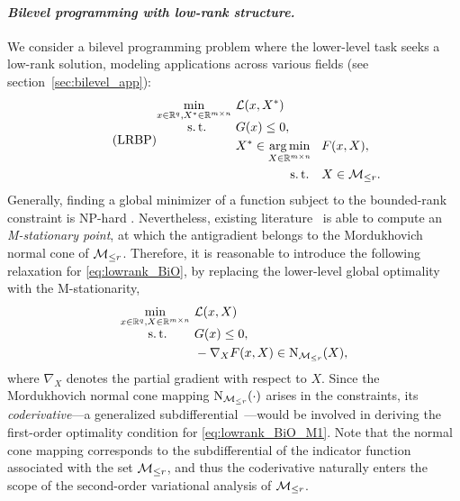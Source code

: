 \paragraph{\emph{\textbf{Bilevel programming with low-rank structure.}}}
We consider a bilevel programming problem where the lower-level task seeks a low-rank solution, modeling applications across various fields \cite{shaban2019truncated,grangier2023LLMshift,shen2025seal,zangrando2025debora} (see section~\ref{sec:bilevel_app}):
\begin{equation}\label{eq:lowrank_BiO}\tag{LRBP}
    \begin{aligned}
    \min_{x\in\mbR^q,X^*\in\mbR^{m\times n}}&\ \lanifold(x,X^*)\\[-1.5mm]
    \mathrm{s.\,t.}\ \ \ \ \ \ &\ G(x)\le 0,
        \\
        &\ X^*\in \argmin_{X\in\mbRmn}\ \ F(x,X),
        \\
        &\ \ \ \ \ \ \ \ \ \ \ \ \ \ \mathrm{s.\,t.}\ \ \ X\in\boundedrank.
    \end{aligned}
\end{equation}
Generally, finding a global minimizer of a function subject to the bounded-rank constraint is NP-hard \cite{gillis2011NPlowrank}. Nevertheless, existing literature~\cite{schneider2015Lojaconvergence,levin2023remedy,jia2023convergencePGDKL,aragon2024coderivativeNewton} is able to compute an \emph{M-stationary point}, at which the antigradient belongs to the Mordukhovich normal cone of $\mathcal{M}_{\le r}$. Therefore, it is reasonable to introduce the following relaxation for \eqref{eq:lowrank_BiO}, by replacing the lower-level global optimality with the M-stationarity,
\begin{equation}\label{eq:lowrank_BiO_M1}
\begin{aligned}
    \min_{x\in\mbR^q,X\in\mbR^{m\times n}}&\ \lanifold(x,X)\\[-1.5mm]
    \mathrm{s.\,t.}\ \ \ \ \ \,&\ G(x)\le 0,
        \\
        &\ -\nabla_X F(x,X)\in\normal_{\boundedrank}(X),
    \end{aligned}
\end{equation}
where $\nabla_X$ denotes the partial gradient with respect to $X$. Since the Mordukhovich normal cone mapping $\mathrm{N}_{\mathcal{M}_{\le r}}(\cdot)$ arises in the constraints, its \emph{coderivative}---a generalized subdifferential~\cite{mordukhovich2006variationalI}---would be involved in deriving the first-order optimality condition for \eqref{eq:lowrank_BiO_M1}. Note that the normal cone mapping corresponds to the subdifferential of the indicator function associated with the set $\mathcal{M}_{\le r}$, and thus the coderivative naturally enters the scope of the second-order variational analysis of $\mathcal{M}_{\le r}$.

